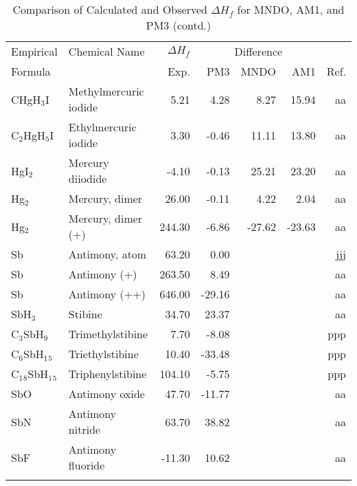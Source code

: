 \begin{table}
\caption{Comparison of Calculated and Observed $\Delta H_f$ 
for MNDO, AM1, and PM3 (contd.)}
\begin{center}
\compresstable
\begin{tabular}{llrrrrr}
Empirical & Chemical Name & $\Delta H_f$ & \multicolumn{3}{c}{Difference} & \\
Formula   &               & Exp. & PM3 &  MNDO  &  AM1 &     Ref.\\
\hline
 CHgH$_3$I      & Methylmercuric iodide                  &     5.21    &     4.28  &     8.27  &    15.94  &     aa\\
 C$_2$HgH$_5$I     & Ethylmercuric iodide                   &     3.30    &    -0.46  &    11.11  &    13.80  &     aa\\
 HgI$_2$        & Mercury diiodide                       &    -4.10    &    -0.13  &    25.21  &    23.20  &     aa\\
 Hg$_2$         & Mercury, dimer                         &    26.00    &    -0.11  &     4.22  &     2.04  &     aa\\
 Hg$_2$         & Mercury, dimer (+)                     &   244.30    &    -6.86  &   -27.62  &   -23.63  &     aa\\
 Sb          & Antimony, atom                         &    63.20    &     0.00  &  &  &    jjj\\
 Sb          & Antimony (+)                           &   263.50    &     8.49  &  &  &     aa\\
 Sb          & Antimony (++)                          &   646.00    &   -29.16  &  &  &     aa\\
 SbH$_3$        & Stibine                                &    34.70    &    23.37  &  &  &     aa\\
 C$_3$SbH$_9$      & Trimethylstibine                       &     7.70    &    -8.08  &  &  &    ppp\\
 C$_6$SbH$_1$$_5$     & Triethylstibine                        &    10.40    &   -33.48  &  &  &    ppp\\
 C$_1$$_8$SbH$_1$$_5$    & Triphenylstibine                       &   104.10    &    -5.75  &  &  &    ppp\\
 SbO         & Antimony oxide                         &    47.70    &   -11.77  &  &  &     aa\\
 SbN         & Antimony nitride                       &    63.70    &    38.82  &  &  &     aa\\
 SbF         & Antimony fluoride                      &   -11.30    &    10.62  &  &  &     aa\\
$$
\end{tabular}
\end{center}
\end{table}
